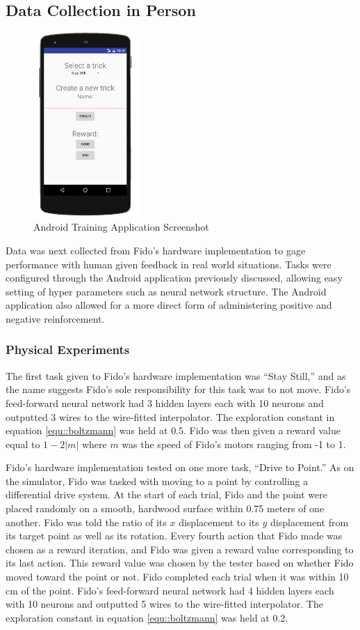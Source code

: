 \subsection{Data Collection in Person}

\begin{figure}[ht]
	\centering
	\includegraphics[height=7cm]{Figures/AppShot.png}
	\caption{Android Training Application Screenshot}
\end{figure}

Data was next collected from Fido's hardware implementation to gage performance with human given feedback in real world situations.
Tasks were configured through the Android application previously discussed, allowing easy setting of hyper parameters such as neural network structure.
The Android application also allowed for a more direct form of administering positive and negative reinforcement.


\subsubsection{Physical Experiments}

The first task given to Fido's hardware implementation was ``Stay Still,'' and as the name suggests Fido's sole responsibility for this task was to not move.
Fido's feed-forward neural network had 3 hidden layers each with 10 neurons and outputted 3 wires to the wire-fitted interpolator.
The exploration constant in equation \ref{equ::boltzmann} was held at $0.5$.
Fido was then given a reward value equal to $1 - 2|m|$ where $m$ was the speed of Fido's motors ranging from -1 to 1.

Fido's hardware implementation tested on one more task, ``Drive to Point.'' As on the simulator, Fido was tasked with moving to a point by controlling a differential drive system.
 At the start of each trial, Fido and the point were placed randomly on a smooth, hardwood surface within 0.75 meters of one another.
Fido was told the ratio of its $x$ displacement to its $y$ displacement from its target point as well as its rotation.
Every fourth action that Fido made was chosen as a reward iteration, and Fido was given a reward value corresponding to its last action.
This reward value was chosen by the tester based on whether Fido moved toward the point or not.
Fido completed each trial when it was within 10 cm of the point.
Fido's feed-forward neural network had 4 hidden layers each with 10 neurons and outputted 5 wires to the wire-fitted interpolator.
The exploration constant in equation \ref{equ::boltzmann} was held at 0.2.

